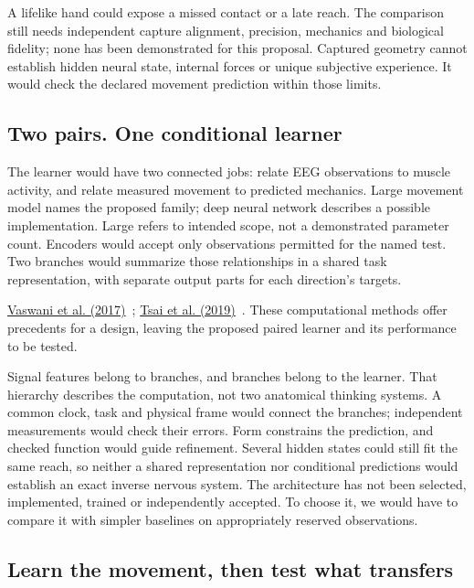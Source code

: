 A lifelike hand could expose a missed contact or a late reach. The comparison
still needs independent capture alignment, precision, mechanics and biological
fidelity; none has been demonstrated for this proposal. Captured geometry
cannot establish hidden neural state, internal forces or unique subjective
experience. It would check the declared movement prediction within those limits.

\subsection{Two pairs. One conditional learner}
The learner would have two connected jobs: relate EEG observations to muscle
activity, and relate measured movement to predicted mechanics. Large movement
model names the proposed family; deep neural network describes a possible
implementation. Large refers to intended scope, not a demonstrated parameter
count. Encoders would accept only observations permitted for the named test.
Two branches would summarize those relationships in a shared task
representation, with separate output parts for each direction's targets.
\par\noindent \href{https://arxiv.org/html/1706.03762v7}{Vaswani et al. (2017)}~\cite{vaswani2017}; \href{https://aclanthology.org/P19-1656/}{Tsai et al. (2019)}~\cite{tsai2019}. These computational methods offer precedents for a design, leaving the proposed paired learner and its performance to be tested.

Signal features belong to branches, and branches belong to the learner.
That hierarchy describes the computation, not two anatomical thinking systems.
A common clock, task and physical frame would connect the branches; independent
measurements would check their errors. Form constrains the prediction, and
checked function would guide refinement. Several hidden states could still
fit the same reach, so neither a shared representation nor conditional
predictions would establish an exact inverse nervous system. The architecture
has not been selected, implemented, trained or independently accepted.
To choose it, we would have to compare it with simpler baselines on
appropriately reserved observations.

\subsection{Learn the movement, then test what transfers}

